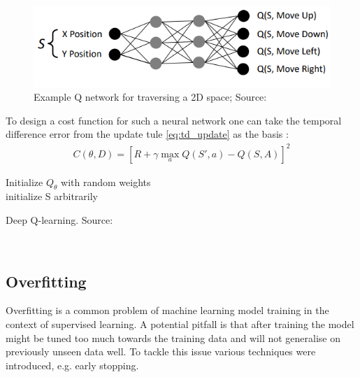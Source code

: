 \begin{figure}[H]
  \centering
  \includegraphics[scale=0.5]{figures/q_network.PNG}
  \caption{Example Q network for traversing a 2D space; Source: \cite{lecture_intro_to_deep_rl}}
  \label{fig:q_network}
\end{figure}

To design a cost function for such a neural network 
one can take the temporal difference error from the update tule \ref{eq:td_update} as the basis \cite{lecture_intro_to_deep_rl}:
\begin{align}
    C(\theta, D) = [R + \gamma \max_a Q(S', a) - Q(S, A)]^2
\end{align}

\begin{algorithm}[H]
\SetAlgoLined
Initialize $Q_{\theta}$ with random weights \theta \; \\
initialize S arbitrarily\;\\
\caption{Deep Q-learning. Source: \cite{lecture_dqn} }
\end{algorithm}\\

\subsection{Overfitting}

Overfitting is a common problem of machine learning 
model training in the context of supervised learning.
A potential pitfall is that after training the model
might be tuned too much towards the training data
and will not generalise on previously unseen data well.
To tackle this issue various techniques were introduced, 
e.g. early stopping. \\

